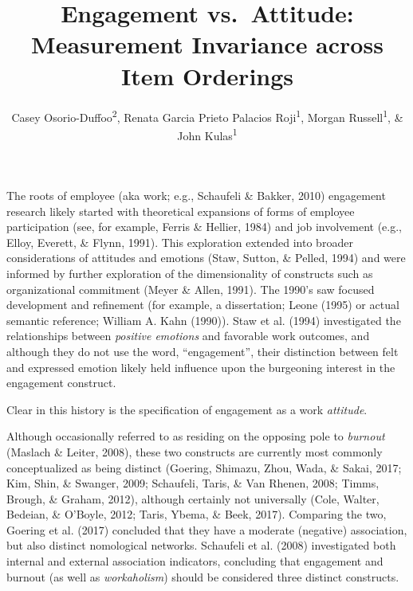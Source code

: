 \documentclass[
  english,
  man]{apa6}
\title{Engagement vs.~Attitude: Measurement Invariance across Item Orderings}
\author{Casey Osorio-Duffoo\textsuperscript{2}, Renata Garcia Prieto Palacios Roji\textsuperscript{1}, Morgan Russell\textsuperscript{1}, \& John Kulas\textsuperscript{1}}
\date{}
\affiliation{\vspace{0.5cm}\textsuperscript{1} Montclair State University\\\textsuperscript{2} Harver}
\begin{document}
\maketitle

The roots of employee (aka work; e.g., Schaufeli \& Bakker, 2010) engagement research likely started with theoretical expansions of forms of employee participation (see, for example, Ferris \& Hellier, 1984) and job involvement (e.g., Elloy, Everett, \& Flynn, 1991). This exploration extended into broader considerations of attitudes and emotions (Staw, Sutton, \& Pelled, 1994) and were informed by further exploration of the dimensionality of constructs such as organizational commitment (Meyer \& Allen, 1991). The 1990's saw focused development and refinement (for example, a dissertation; Leone (1995) or actual semantic reference; William A. Kahn (1990)). Staw et al. (1994) investigated the relationships between \emph{positive emotions} and favorable work outcomes, and although they do not use the word, \enquote{engagement}, their distinction between felt and expressed emotion likely held influence upon the burgeoning interest in the engagement construct.

Clear in this history is the specification of engagement as a work \emph{attitude}.

Although occasionally referred to as residing on the opposing pole to \emph{burnout} (Maslach \& Leiter, 2008), these two constructs are currently most commonly conceptualized as being distinct (Goering, Shimazu, Zhou, Wada, \& Sakai, 2017; Kim, Shin, \& Swanger, 2009; Schaufeli, Taris, \& Van Rhenen, 2008; Timms, Brough, \& Graham, 2012), although certainly not universally (Cole, Walter, Bedeian, \& O'Boyle, 2012; Taris, Ybema, \& Beek, 2017). Comparing the two, Goering et al. (2017) concluded that they have a moderate (negative) association, but also distinct nomological networks. Schaufeli et al. (2008) investigated both internal and external association indicators, concluding that engagement and burnout (as well as \emph{workaholism}) should be considered three distinct constructs.
\end{document}
